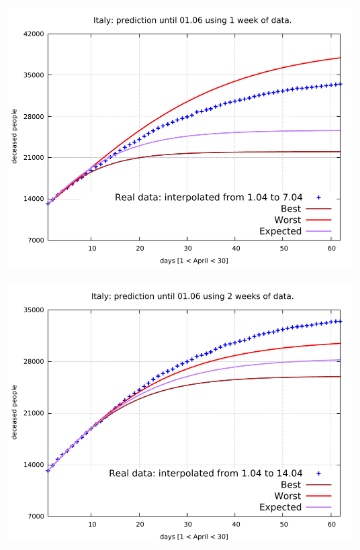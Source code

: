 \documentclass[8pt]{article}
\begin{document}
\begin{figure}[h!]
  \centering
  \begin{subfigure}[b]{0.45\linewidth}
  \includegraphics[width=\linewidth]{../err100p_simulations/it/1-7/1-7.pdf}
  \end{subfigure}
  \begin{subfigure}[b]{0.45\linewidth}
    \includegraphics[width=\linewidth]{../err100p_simulations/it/1-14/1-14.pdf}
  \end{subfigure}
  \begin{subfigure}[b]{0.45\linewidth}

\end{subfigure}
\end{figure}
\end{document}
